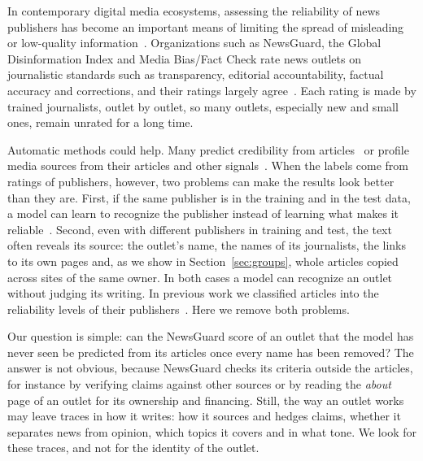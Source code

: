 \documentclass[11pt,a4paper]{article}
\begin{document}
In contemporary digital media ecosystems, assessing the reliability of news publishers has become an important means
of limiting the spread of misleading or low-quality information~\cite{Bowman2003,Jemielniak2020}. Organizations such as
NewsGuard, the Global Disinformation Index and Media Bias/Fact Check rate news outlets on journalistic standards such as
transparency, editorial accountability, factual accuracy and corrections, and their ratings largely
agree~\cite{lin2023high,DBLP:conf/icwsm/PratelliP22}. Each rating is made by trained journalists, outlet by outlet, so
many outlets, especially new and small ones, remain unrated for a long time.

Automatic methods could help. Many predict credibility from articles~\cite{pandolfi2020automatic,Przybyla2021plugin,
10.1145/3770077,DBLP:journals/dbsk/AdjiLS26} or profile media sources from their articles and other
signals~\cite{baly2018predicting,baly2020written,nakov2024survey}. When the labels come from ratings of publishers,
however, two problems can make the results look better than they are. First, if the same publisher is in the training
and in the test data, a model can learn to recognize the publisher instead of learning what makes it
reliable~\cite{zhou2021hidden,azizov-etal-2024-safari,verhoeven2025yesterday}. Second, even with different publishers
in training and test, the text often reveals its source: the outlet's name, the names of its journalists, the links to
its own pages and, as we show in Section~\ref{sec:groups}, whole articles copied across sites of the same owner. In both
cases a model can recognize an outlet without judging its writing. In previous work we classified articles into the
reliability levels of their publishers~\cite{Bianchi2024SAC}. Here we remove both problems.

Our question is simple: can the NewsGuard score of an outlet that the model has never seen be predicted from its
articles once every name has been removed? The answer is not obvious, because NewsGuard checks its criteria outside the
articles, for instance by verifying claims against other sources or by reading the \emph{about} page of an outlet for
its ownership and financing. Still, the way an outlet works may leave traces in how it writes: how it sources and hedges
claims, whether it separates news from opinion, which topics it covers and in what tone. We look for these traces, and
not for the identity of the outlet.
\end{document}
